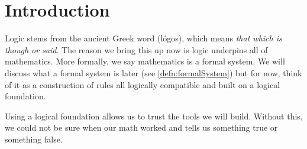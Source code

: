 \section{Introduction}

Logic stems from the ancient Greek word  (l\'{o}gos), which means \emph{that which is though or said}.
The reason we bring this up now is logic underpins all of mathematics.
More formally, we say mathematics is a formal system.
We will discuss what a formal system is later (see \ref{defn:formalSystem}) but for now, think of it as a construction of rules all logically compatible and built on a logical foundation.

Using a logical foundation allows us to trust the tools we will build.
Without this, we could not be sure when our math worked and tells us something true or something false.









